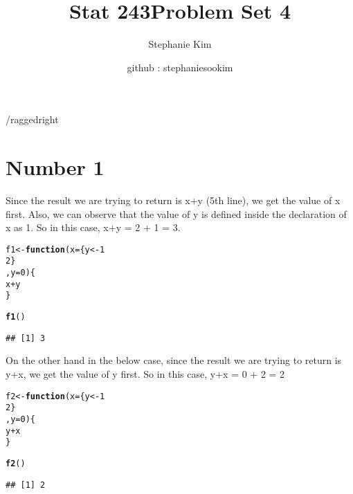 \documentclass[english]{article}\usepackage[]{graphicx}\usepackage[]{color}
\makeatletter
\newcommand{\hlnum}[1]{\textcolor[rgb]{0.686,0.059,0.569}{#1}}%
\newcommand{\hlopt}[1]{\textcolor[rgb]{0,0,0}{#1}}%
\newcommand{\hlstd}[1]{\textcolor[rgb]{0.345,0.345,0.345}{#1}}%
\newcommand{\hlkwa}[1]{\textcolor[rgb]{0.161,0.373,0.58}{\textbf{#1}}}%
\newcommand{\hlkwb}[1]{\textcolor[rgb]{0.69,0.353,0.396}{#1}}%
\newcommand{\hlkwc}[1]{\textcolor[rgb]{0.333,0.667,0.333}{#1}}%
\newcommand{\hlkwd}[1]{\textcolor[rgb]{0.737,0.353,0.396}{\textbf{#1}}}%
\newenvironment{kframe}{%
 \def\at@end@of@kframe{}%
 \ifinner\ifhmode%
  \def\at@end@of@kframe{\end{minipage}}%
  \begin{minipage}{\columnwidth}%
 \fi\fi%
 \def\FrameCommand##1{\hskip\@totalleftmargin \hskip-\fboxsep
 \colorbox{shadecolor}{##1}\hskip-\fboxsep
     \hskip-\linewidth \hskip-\@totalleftmargin \hskip\columnwidth}%
 \MakeFramed {\advance\hsize-\width
   \@totalleftmargin\z@ \linewidth\hsize
   \@setminipage}}%
 {\par\unskip\endMakeFramed%
 \at@end@of@kframe}
\newenvironment{knitrout}{}{} %
\makeatother
\begin{document}
\title{Stat 243}


\title{Problem Set 4}


\author{Stephanie Kim}


\author{github : stephaniesookim}

\maketitle
/raggedright


\section*{Number 1}

Since the result we are trying to return is x+y (5th line), we get
the value of x first. Also, we can observe that the value of y is
defined inside the declaration of x as 1. So in this case, x+y = 2
+ 1 = 3.

\begin{knitrout}
\color{fgcolor}\begin{kframe}
\begin{alltt}
\hlstd{f1} \hlkwb{<-} \hlkwa{function}\hlstd{(}\hlkwc{x}\hlstd{=\{y} \hlkwb{<-} \hlnum{1}
                                  \hlnum{2}\hlstd{\}}
                           \hlstd{,} \hlkwc{y}\hlstd{=}\hlnum{0}\hlstd{) \{}
  \hlstd{x}\hlopt{+}\hlstd{y}
\hlstd{\}}


\hlkwd{f1}\hlstd{()}
\end{alltt}
\begin{verbatim}
## [1] 3
\end{verbatim}
\end{kframe}
\end{knitrout}

On the other hand in the below case, since the result we are trying
to return is y+x, we get the value of y first. So in this case, y+x
= 0 + 2 = 2

\begin{knitrout}
\color{fgcolor}\begin{kframe}
\begin{alltt}
\hlstd{f2} \hlkwb{<-} \hlkwa{function}\hlstd{(}\hlkwc{x}\hlstd{=\{y} \hlkwb{<-} \hlnum{1}
                                  \hlnum{2}\hlstd{\}}
                           \hlstd{,} \hlkwc{y}\hlstd{=}\hlnum{0}\hlstd{) \{}
  \hlstd{y}\hlopt{+}\hlstd{x}
\hlstd{\}}


\hlkwd{f2}\hlstd{()}
\end{alltt}
\begin{verbatim}
## [1] 2
\end{verbatim}
\end{kframe}
\end{knitrout}
\end{document}

